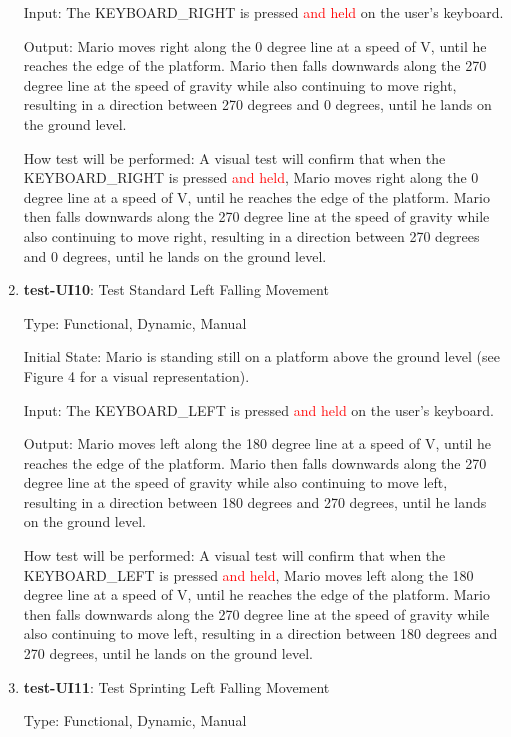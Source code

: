 \documentclass[12pt, titlepage]{article}
\begin{document}
\begin{enumerate}
Input: The KEYBOARD\_RIGHT is pressed \textcolor{red}{and held} on the user's keyboard.

Output: Mario moves right along the 0 degree line at a speed of V, until he reaches the edge of the platform. Mario then falls downwards along the 270 degree line at the speed of gravity while also continuing to move right, resulting in a direction between 270 degrees and 0 degrees, until he lands on the ground level.

How test will be performed: A visual test will confirm that when the KEYBOARD\_RIGHT is pressed \textcolor{red}{and held}, Mario moves right along the 0 degree line at a speed of V, until he reaches the edge of the platform. Mario then falls downwards along the 270 degree line at the speed of gravity while also continuing to move right, resulting in a direction between 270 degrees and 0 degrees, until he lands on the ground level.

\item{\textbf{test-UI10}: Test Standard Left Falling Movement\\}

Type: Functional, Dynamic, Manual

Initial State: Mario is standing still on a platform above the ground level (see Figure 4 for a visual representation).

Input: The KEYBOARD\_LEFT is pressed \textcolor{red}{and held} on the user's keyboard.

Output: Mario moves left along the 180 degree line at a speed of V, until he reaches the edge of the platform. Mario then falls downwards along the 270 degree line at the speed of gravity while also continuing to move left, resulting in a direction between 180 degrees and 270 degrees, until he lands on the ground level.

How test will be performed: A visual test will confirm that when the KEYBOARD\_LEFT is pressed \textcolor{red}{and held}, Mario moves left along the 180 degree line at a speed of V, until he reaches the edge of the platform. Mario then falls downwards along the 270 degree line at the speed of gravity while also continuing to move left, resulting in a direction between 180 degrees and 270 degrees, until he lands on the ground level.

\item{\textbf{test-UI11}: Test Sprinting Left Falling Movement\\}

Type: Functional, Dynamic, Manual


\end{enumerate}
\end{document}
